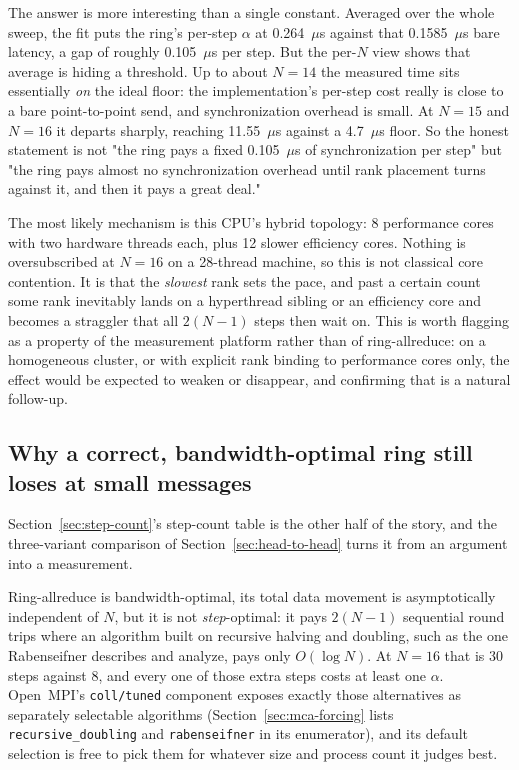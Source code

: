 The answer is more interesting than a single constant. Averaged over the whole sweep, the fit puts the ring's per-step $\alpha$ at 0.264~$\mu$s against that 0.1585~$\mu$s bare latency, a gap of roughly 0.105~$\mu$s per step. But the per-$N$ view shows that average is hiding a threshold. Up to about $N=14$ the measured time sits essentially \emph{on} the ideal floor: the implementation's per-step cost really is close to a bare point-to-point send, and synchronization overhead is small. At $N=15$ and $N=16$ it departs sharply, reaching 11.55~$\mu$s against a 4.7~$\mu$s floor. So the honest statement is not "the ring pays a fixed 0.105~$\mu$s of synchronization per step" but "the ring pays almost no synchronization overhead until rank placement turns against it, and then it pays a great deal."

The most likely mechanism is this CPU's hybrid topology: 8 performance cores with two hardware threads each, plus 12 slower efficiency cores. Nothing is oversubscribed at $N=16$ on a 28-thread machine, so this is not classical core contention. It is that the \emph{slowest} rank sets the pace, and past a certain count some rank inevitably lands on a hyperthread sibling or an efficiency core and becomes a straggler that all $2(N-1)$ steps then wait on. This is worth flagging as a property of the measurement platform rather than of ring-allreduce: on a homogeneous cluster, or with explicit rank binding to performance cores only, the effect would be expected to weaken or disappear, and confirming that is a natural follow-up.

\subsection{Why a correct, bandwidth-optimal ring still loses at small messages}

Section~\ref{sec:step-count}'s step-count table is the other half of the story, and the three-variant comparison of Section~\ref{sec:head-to-head} turns it from an argument into a measurement.

Ring-allreduce is bandwidth-optimal, its total data movement is asymptotically independent of $N$, but it is not \emph{step}-optimal: it pays $2(N-1)$ sequential round trips where an algorithm built on recursive halving and doubling, such as the one Rabenseifner describes and \citet{thakur2005optimization} analyze, pays only $O(\log N)$. At $N=16$ that is 30 steps against 8, and every one of those extra steps costs at least one $\alpha$. Open~MPI's \texttt{coll/tuned} component exposes exactly those alternatives as separately selectable algorithms (Section~\ref{sec:mca-forcing} lists \texttt{recursive\_doubling} and \texttt{rabenseifner} in its enumerator), and its default selection is free to pick them for whatever size and process count it judges best.


